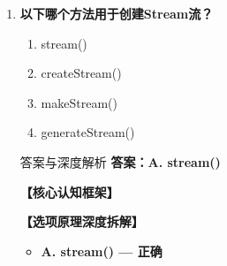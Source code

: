 \documentclass[12pt, a4paper]{ctexart}
\begin{document}
\begin{enumerate}[label=\textbf{\arabic*.}]
\begin{bluebox}{答案与深度解析}
\begin{itemize}[label={}, leftmargin=*, nosep]
\begin{itemize}[label={}, nosep]
			      \item 支持！parallelStream()利用多核
		      

					  \end{itemize}
		      \item \textbf{D. 不能过滤 — 错误}
					  \begin{itemize}[label={}, nosep]
		      
			      \item filter()用于过滤数据
		      
		      

		      
					  \end{itemize}
					  \end{itemize}
\textbf{【应背诵知识点】}

		      Stream操作分类：
		      \begin{itemize}[label={}, nosep]
			      \item 中间操作：filter、map、sorted、distinct...
			      \item 终端操作：forEach、collect、reduce、count...
			      \item 惰性求值：中间操作不执行，等终端操作触发
			      \item parallelStream()：并行流，提升性能
		      \end{itemize}
	      \end{bluebox}

	      \vspace{1em}

	\item \textbf{以下哪个方法用于创建Stream流？}
	      \begin{enumerate}[label=\Alph*.]
		      \item stream()
		      \item createStream()
		      \item makeStream()
		      \item generateStream()
	      \end{enumerate}

	      \begin{bluebox}{答案与深度解析}
		      \textbf{答案：A. stream()}

		      \textbf{【核心认知框架】}

		      \textbf{【选项原理深度拆解】}
					  \begin{itemize}[label={}, leftmargin=*, nosep]

		      
		      \item \textbf{A. stream() — 正确}
					  \begin{itemize}[label={}, nosep]
		      

\end{itemize}
\end{itemize}
\end{bluebox}
\end{enumerate}
\end{document}
